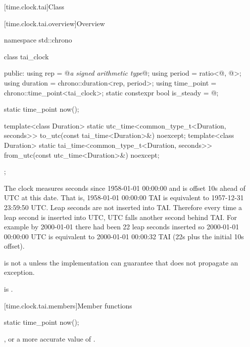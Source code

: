 [time.clock.tai]{Class }

[time.clock.tai.overview]{Overview}
%

\begin{codeblock}
namespace std::chrono {
  class tai_clock {
  public:
    using rep                       = @\textit{a signed arithmetic type}@;
    using period                    = ratio<@\unspecnc@, @\unspec@>;
    using duration                  = chrono::duration<rep, period>;
    using time_point                = chrono::time_point<tai_clock>;
    static constexpr bool is_steady = @\unspec@;

    static time_point now();

    template<class Duration>
      static utc_time<common_type_t<Duration, seconds>>
        to_utc(const tai_time<Duration>&) noexcept;
    template<class Duration>
      static tai_time<common_type_t<Duration, seconds>>
        from_utc(const utc_time<Duration>&) noexcept;
  };
}
\end{codeblock}

\pnum
The clock  measures seconds since 1958-01-01 00:00:00
and is offset 10s ahead of UTC at this date.
That is, 1958-01-01 00:00:00 TAI is equivalent to 1957-12-31 23:59:50 UTC\@.
Leap seconds are not inserted into TAI\@.
Therefore every time a leap second is inserted into UTC,
UTC falls another second behind TAI\@.
For example by 2000-01-01 there had been 22 leap seconds inserted
so 2000-01-01 00:00:00 UTC is equivalent to 2000-01-01 00:00:32 TAI
(22s plus the initial 10s offset).

\pnum
{} is not a 
unless the implementation can guarantee that 
does not propagate an exception.
\begin{note}
 is .
\end{note}

[time.clock.tai.members]{Member functions}

%
\begin{itemdecl}
static time_point now();
\end{itemdecl}

\begin{itemdescr}
\pnum
\returns
{}, or a more accurate value of .
\end{itemdescr}

